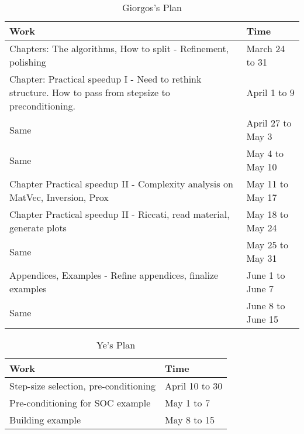 \documentclass[]{article}
\begin{document}
\begin{table}[h]
\begin{tabular}{|p{13cm}|l|}
\hline
\textbf{Work}  & \textbf{Time} \\ \hline
Chapters: The algorithms, How to split - Refinement, polishing & March 24 to 31 \\ \hline
Chapter: Practical speedup I - Need to rethink structure. How to pass from stepsize 
to preconditioning.  & April 1 to 9 \\ \hline
Same & April 27 to May 3 \\ \hline
Same & May 4 to May 10 \\ \hline
Chapter Practical speedup II - Complexity analysis on MatVec, Inversion, Prox & May 11 to May 17 \\ \hline
Chapter Practical speedup II - Riccati, read material, generate plots & May 18 to May 24 \\ \hline
Same & May 25 to May 31 \\ \hline
Appendices, Examples - Refine appendices, finalize examples & June 1 to June 7 \\ \hline 
Same & June 8 to June 15 \\ \hline
\end{tabular}

\caption{Giorgos's Plan }
\label{tab:Giorgos_plan}
\end{table}



\begin{table}[h]
\center
\begin{tabular}{|l|l|}
\hline
\textbf{Work}  & \textbf{Time} \\ \hline
Step-size selection, pre-conditioning & April 10 to 30 \\ \hline
Pre-conditioning for SOC example & May 1 to 7 \\ \hline
Building example & May 8 to 15 \\ \hline
\end{tabular}

\caption{Ye's Plan }
\label{tab:Ye_plan}
\end{table}
\end{document}
